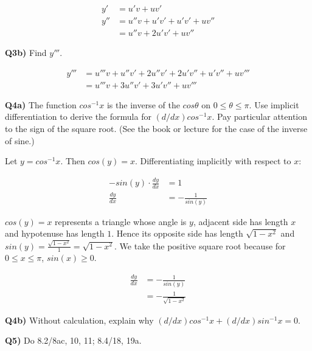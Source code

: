 \documentclass[9pt]{article}
\begin{document}
\begin{align*}
  y' &= u'v + uv'\\
  y'' &= u''v + u'v' + u'v' + uv''\\
      &= u''v + 2u'v' + uv''
\end{align*}


\begin{tcolorbox}
  \textbf{Q3b)} Find $y'''$.
\end{tcolorbox}

\begin{align*}
  y''' &= u'''v + u''v' + 2u''v' + 2u'v'' + u'v'' + uv'''\\
       &= u'''v + 3u''v' + 3u'v'' + uv'''
\end{align*}


\begin{tcolorbox}
  \textbf{Q4a)} The function $cos^{-1}x$ is the inverse of the $cos\theta$ on $0 \leq \theta \leq \pi$. Use implicit differentiation to derive the formula for $(d/dx)cos^{-1}x$. Pay particular attention to the sign of the square root. (See the book or lecture for the case of the inverse of sine.)
\end{tcolorbox}

Let $y = cos^{-1}x$. Then $cos(y) = x$. Differentiating implicitly with respect to $x$:

\begin{align*}
  -sin(y) \cdot \frac{dy}{dx} &= 1\\
  \frac{dy}{dx} &= -\frac{1}{sin(y)}
\end{align*}

$cos(y) = x$ represents a triangle whose angle is $y$, adjacent side has length $x$ and hypotenuse has length $1$. Hence its opposite side has length $\sqrt{1 - x^2}$ and $sin(y) = \frac{\sqrt{1 - x^2}}{1} = \sqrt{1 - x^2}$. We take the positive square root because for $0 \leq x \leq \pi$, $sin(x) \geq 0$.

\begin{align*}
  \frac{dy}{dx} &= -\frac{1}{sin(y)}\\
                &= -\frac{1}{\sqrt{1 - x^2}}
\end{align*}


\begin{tcolorbox}
  \textbf{Q4b)} Without calculation, explain why $(d/dx)cos^{-1}x + (d/dx)sin^{-1}x = 0$.
\end{tcolorbox}


\begin{tcolorbox}
  \textbf{Q5)} Do 8.2/8ac, 10, 11; 8.4/18, 19a.
\end{tcolorbox}
\end{document}
